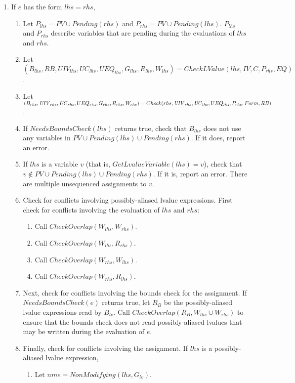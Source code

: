 \begin{enumerate}
\item If $e$ has the form $lhs = rhs$,
\label{list:check-lval-assignment}
\begin{enumerate}
\item Let $P_{lhs} = PV \cup Pending(rhs)$ and $P_{rhs} = PV \cup Pending(lhs).$   $P_{lhs}$
        and $P_{rhs}$ describe variables that are pending during the evaluations of $lhs$ and $rhs$.
\item Let $(B_{lhs}, RB, \mathit{UIV}_{lhs}, \mathit{UC}_{lhs}, {UEQ}_{lhs}, G_{lhs}, R_{lhs}, W_{lhs}) =
        CheckLValue(lhs, IV, C, P_{rhs}, EQ)$.  
\item Let $(B_{rhs}, \mathit{UIV}_{rhs},  \mathit{UC}_{rhs}, {UEQ}_{rhs}, G_{rhs}, R_{rhs}, W_{rhs}) = \\
        Check(rhs, \mathit{UIV}_{rhs}, \mathit{UC}_{lhs}, {UEQ}_{lhs}, P_{rhs}, Form, RB)$.
\item If $NeedsBoundsCheck(lhs)$ returns true, check that $B_{lhs}$ does not use any variables in 
$PV \cup Pending(lhs) \cup Pending(rhs)$.  If it does, report an error.
\item If $lhs$ is a variable $v$ (that is, $GetLvalueVariable(lhs) = { v }$), 
check that $v \notin PV \cup Pending(lhs) \cup Pending(rhs)$.  If it is, report an error.  
There are multiple unsequenced assignments to $v$.
\item Check for conflicts involving possibly-aliased lvalue expressions. First check for conflicts
involving the evaluation of $lhs$ and $rhs$:
\begin{enumerate}
\item Call $CheckOverlap(W_{lhs}, W_{rhs})$.
\item Call $CheckOverlap(W_{lhs}, R_{rhs})$.
\item Call $CheckOverlap(W_{rhs}, W_{lhs})$.
\item Call $CheckOverlap(W_{rhs}, R_{lhs})$.
\end{enumerate}
\item Next, check for conflicts involving the bounds check for the assignment.
If $NeedsBoundsCheck(e)$ returns true, let $R_B$ be the possibly-aliased lvalue expressions read by
$B_{lv}$.  Call $CheckOverlap(R_B, W_{lhs} \cup W_{rhs})$ to ensure that the bounds check does
not read possibly-aliased lvalues that may be written during the evaluation of $e$.
\item Finally, check for conflicts involving the assignment. If $lhs$ is a possibly-aliased
lvalue expression,
\begin{enumerate}
\item Let $nme = NonModifying(lhs, G_{lv})$. 

\end{enumerate}
\end{enumerate}
\end{enumerate}
